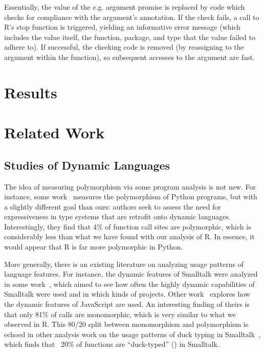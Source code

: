 \documentclass[sigplan,10pt,review,anonymous]{acmart}\settopmatter{printfolios=true,printccs=false,printacmref=false}
\begin{document}
Essentially, the value of the e.g. argument promise is replaced by code which checks for compliance with the argument's annotation.
If the check fails, a call to R's stop function is triggered, yielding an informative error message (which includes the value itself, the function, package, and type that the value failed to adhere to).
If successful, the checking code is removed (by reassigning to the argument within the function), so subsequent accesses to the argument are fast.



%
%
%
%
%
%
\section{Results}
\label{sec:results}



%
%
%
%
%
%
\section{Related Work}


%
%
%
%
\subsection{Studies of Dynamic Languages}

The idea of measuring polymorphism via some program analysis is not new.
For instance, some work~\cite{aakerblom2015measuring} measures the polymorphism of Python programs, but with a slightly different goal than ours: authors seek to assess the need for expressiveness in type systems that are retrofit onto dynamic languages.
Interestingly, they find that 4\% of function call sites are polymorphic, which is considerably less than what we have found with our analysis of R.
In essence, it would appear that R is far more polymorphic in Python.

More generally, there is an existing literature on analyzing usage patterns of language features.  
For instance, the dynamic features of Smalltalk were analyzed in some work~\cite{callau2011howdevelopers}, which aimed to see how often the highly dynamic capabilities of Smalltalk were used and in which kinds of projects.
Other work~\cite{pldi10a} explores how the dynamic features of JavaScript are used.
An interesting finding of theirs is that only 81\% of calls are monomorphic, which is very similar to what we observed in R.
This 80/20 split between monomorphism and polymorphism is echoed in other analysis work on the usage patterns of duck typing in Smalltalk~\cite{milojkovic2017duck}, which finds that ~20\% of functions are ``duck-typed'' () in Smalltalk. 
\end{document}
